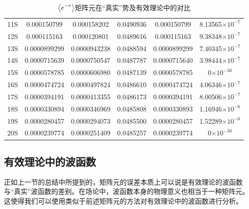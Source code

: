 \documentclass[cs4size,titlepage,twoside]{ctexart}
\begin{document}
\begin{table}[!htp]
\begin{tabular}{|cccccc|}
 11S & 0.000150799 & 0.000158202 & 0.0490936 & 0.000150799 & 8.13565$\times 10^{-7}$ \\
 12S & 0.000115163 & 0.000120801 & 0.0489616 & 0.000115163 & 9.38348$\times 10^{-7}$ \\
 13S & 0.0000899299 & 0.0000943238 & 0.0488594 & 0.0000899299 & 7.40345$\times 10^{-7}$ \\
 14S & 0.0000715639 & 0.0000750547 & 0.0487787 & 0.0000715640 & 3.98444$\times 10^{-7}$ \\
 15S & 0.0000578785 & 0.0000606980 & 0.0487139 & 0.0000578785 & 0$\times 10^{-50}$ \\
 16S & 0.0000474724 & 0.0000497824 & 0.0486610 & 0.0000474724 & 4.06346$\times 10^{-7}$ \\
 17S & 0.0000394191 & 0.0000413355 & 0.0486173 & 0.0000394191 & 8.00506$\times 10^{-7}$ \\
 18S & 0.0000330894 & 0.0000346969 & 0.0485808 & 0.0000330893 & 1.16946$\times 10^{-6}$ \\
 19S & 0.0000280457 & 0.0000294073 & 0.0485500 & 0.0000280457 & 1.52289$\times 10^{-6}$ \\
 20S & 0.0000239774 & 0.0000251409 & 0.0485257 & 0.0000239774 & 0$\times 10^{-50}$ \\
 \hline
\end{tabular}
	\caption{$\displaystyle\expval{e^{-r}}$矩阵元在“真实”势及有效理论中的对比}\label{ever}
\end{table}
\subsection{有效理论中的波函数}
正如上一节的总结中所提到的，矩阵元的误差本质上可以说是有效理论的波函数与“真实”波函数的差别。在场论中，波函数本身的物理意义也相当于一种矩阵元。这使得我们可以使用类似于前述矩阵元的方法对有效理论中的波函数进行分析。
\end{document}
